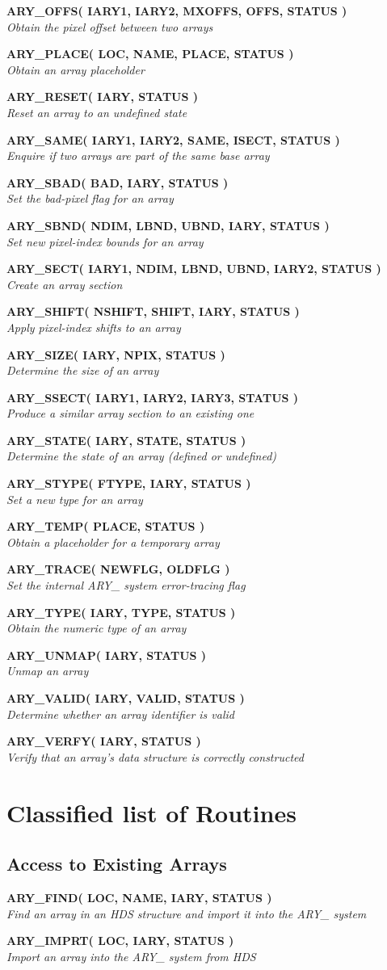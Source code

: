 \documentclass[twoside,11pt]{article}
\newcommand{\xlabel}[1]{}
\newcommand{\noteroutine}[2]{\textbf{#1}\hspace*{\fill}\nopagebreak \\
                             \hspace*{3em}\emph{#2}\hspace*{\fill}\par}
\begin{document}
\begin{eqn*}
\noteroutine{ARY\_OFFS( IARY1, IARY2, MXOFFS, OFFS, STATUS )}
            {Obtain the pixel offset between two arrays}
\noteroutine{ARY\_PLACE( LOC, NAME, PLACE, STATUS )}
            {Obtain an array placeholder}
\noteroutine{ARY\_RESET( IARY, STATUS )}
            {Reset an array to an undefined state}
\noteroutine{ARY\_SAME( IARY1, IARY2, SAME, ISECT, STATUS )}
            {Enquire if two arrays are part of the same base array}
\noteroutine{ARY\_SBAD( BAD, IARY, STATUS )}
            {Set the bad-pixel flag for an array}
\noteroutine{ARY\_SBND( NDIM, LBND, UBND, IARY, STATUS )}
            {Set new pixel-index bounds for an array}
\noteroutine{ARY\_SECT( IARY1, NDIM, LBND, UBND, IARY2, STATUS )}
            {Create an array section}
\noteroutine{ARY\_SHIFT( NSHIFT, SHIFT, IARY, STATUS )}
            {Apply pixel-index shifts to an array}
\noteroutine{ARY\_SIZE( IARY, NPIX, STATUS )}
            {Determine the size of an array}
\noteroutine{ARY\_SSECT( IARY1, IARY2, IARY3, STATUS )}
            {Produce a similar array section to an existing one}
\noteroutine{ARY\_STATE( IARY, STATE, STATUS )}
            {Determine the state of an array (defined or undefined)}
\noteroutine{ARY\_STYPE( FTYPE, IARY, STATUS )}
            {Set a new type for an array}
\noteroutine{ARY\_TEMP( PLACE, STATUS )}
            {Obtain a placeholder for a temporary array}
\noteroutine{ARY\_TRACE( NEWFLG, OLDFLG )}
            {Set the internal ARY\_ system error-tracing flag}
\noteroutine{ARY\_TYPE( IARY, TYPE, STATUS )}
            {Obtain the numeric type of an array}
\noteroutine{ARY\_UNMAP( IARY, STATUS )}
            {Unmap an array}
\noteroutine{ARY\_VALID( IARY, VALID, STATUS )}
            {Determine whether an array identifier is valid}
\noteroutine{ARY\_VERFY( IARY, STATUS )}
            {Verify that an array's data structure is correctly constructed}


\newpage
\section{\xlabel{classified_list_of_routines}Classified list of Routines}
\label{classified_list_of_routines}


\subsection{\xlabel{access_to_existing_arrays}Access to Existing Arrays}
\label{access_to_existing_arrays}

\noteroutine{ARY\_FIND( LOC, NAME, IARY, STATUS )}
            {Find an array in an HDS structure and import it into the ARY\_ system}
\noteroutine{ARY\_IMPRT( LOC, IARY, STATUS )}
            {Import an array into the ARY\_ system from HDS}



\end{eqn*}
\end{document}
